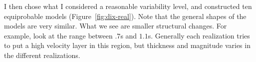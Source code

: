 I then chose what I considered a reasonable variability level,
and constructed ten equiprobable models (Figure~\ref{fig:dix-real}).  
Note that the general
shapes of the models are very similar.  What we  see are smaller structural
changes.  For example, look at the range between $.7$s and $1.1$s.
Generally each realization tries to put a high velocity layer in
this region, but
thickness and magnitude varies in the different realizations. 
%
